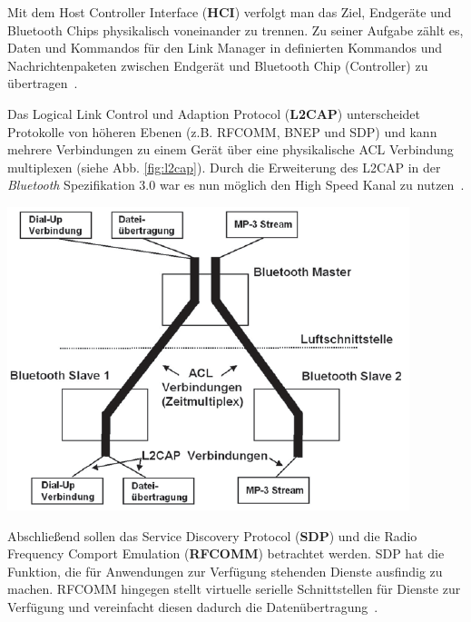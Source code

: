 \begin{multicols}{3}

Mit dem Host Controller Interface (\textbf{HCI}) verfolgt man das Ziel, Endgeräte und Bluetooth Chips physikalisch voneinander zu trennen. Zu seiner Aufgabe zählt es, Daten und Kommandos für den Link Manager in definierten Kommandos und Nachrichtenpaketen zwischen Endgerät und Bluetooth Chip (Controller) zu übertragen~\cite{bluetooth3.0.1}.

Das Logical Link Control und Adaption Protocol (\textbf{L2CAP}) unterscheidet Protokolle von höheren Ebenen (z.B. RFCOMM, BNEP und SDP) und kann mehrere Verbindungen zu einem Gerät über eine physikalische ACL Verbindung multiplexen (siehe Abb. \ref{fig:l2cap}). Durch die Erweiterung des L2CAP in der \textit{Bluetooth} Spezifikation 3.0 war es nun möglich den High Speed Kanal zu nutzen~\cite{bluetooth3.0.1}.

\begin{Figure}
\includegraphics[width=\linewidth]{Kapitel/Bluetooth3.0/Grafiken/l2cap.png}
\label{fig:l2cap}
\end{Figure} 

\noindent
Abschließend sollen das Service Discovery Protocol (\textbf{SDP}) und die Radio Frequency Comport Emulation (\textbf{RFCOMM}) betrachtet werden. SDP hat die Funktion, die für Anwendungen zur Verfügung stehenden Dienste ausfindig zu machen. RFCOMM hingegen stellt virtuelle serielle Schnittstellen für Dienste zur Verfügung und vereinfacht diesen dadurch die Datenübertragung~\cite{bluetooth3.0.3}.


\end{multicols}
